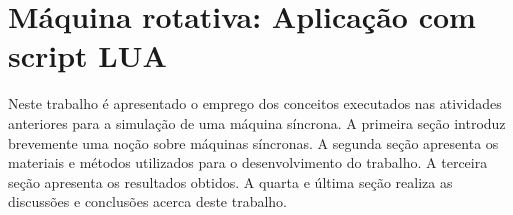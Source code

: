 \chapter{Máquina rotativa: Aplicação com script LUA}
\label{cap4}
Neste trabalho é apresentado o emprego dos conceitos executados nas atividades anteriores para a simulação de uma máquina síncrona. A primeira seção introduz brevemente uma noção sobre máquinas síncronas. A segunda seção apresenta os materiais e métodos utilizados para o desenvolvimento do trabalho. A terceira seção apresenta os resultados obtidos. A quarta e última seção realiza as discussões e conclusões acerca deste trabalho.




